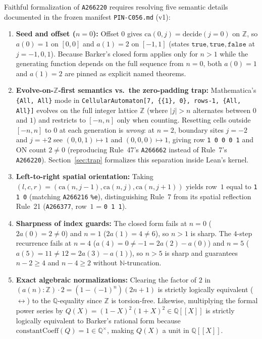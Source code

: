 \documentclass[11pt]{article}
\newcommand{\llbracket}{[\![}
\newcommand{\rrbracket}{]\!]}
\theoremstyle{definition}
\newcommand{\N}{\mathbb{N}}
\newcommand{\Z}{\mathbb{Z}}
\newcommand{\Q}{\mathbb{Q}}
\newcommand{\seq}[1]{\texttt{#1}}
\newcommand{\ca}{\mathrm{ca}}
\newcommand{\btrue}{\mathtt{true}}
\newcommand{\bfalse}{\mathtt{false}}
\begin{document}
Faithful formalization of \seq{A266220} requires resolving five semantic details documented in the frozen manifest \texttt{PIN-C056.md} (v1):
\begin{enumerate}
\item \textbf{Seed and offset ($n = 0$):} Offset $0$ gives $\ca(0, j) = \mathrm{decide}(j = 0)$ on $\Z$, so $a(0) = 1$ on $[0, 0]$ and $a(1) = 2$ on $[-1, 1]$ (states $\btrue, \btrue, \bfalse$ at $j = -1, 0, 1$). Because Barker's closed form applies only for $n > 1$ while the generating function depends on the full sequence from $n = 0$, both $a(0) = 1$ and $a(1) = 2$ are pinned as explicit named theorems.
\item \textbf{Evolve-on-$\Z$-first semantics vs.\ the zero-padding trap:} Mathematica's \texttt{\{All, All\}} mode in \texttt{CellularAutomaton[7, \{\{1\}, 0\}, rows-1, \{All, All\}]} evolves on the full integer lattice $\Z$ (where $|j| > n$ alternates between $0$ and $1$) and restricts to $[-n, n]$ only when counting. Resetting cells outside $[-n, n]$ to $0$ at each generation is \emph{wrong}: at $n = 2$, boundary sites $j = -2$ and $j = +2$ see $(0, 0, 1) \mapsto 1$ and $(0, 0, 0) \mapsto 1$, giving row \texttt{1 0 0 0 1} and ON count $2 \ne 0$ (reproducing Rule~47's \seq{A266662} instead of Rule~7's \seq{A266220}). Section~\ref{sec:trap} formalizes this separation inside Lean's kernel.
\item \textbf{Left-to-right spatial orientation:} Taking $(l, c, r) = (\ca(n, j - 1), \ca(n, j), \ca(n, j + 1))$ yields row~$1$ equal to \texttt{1 1 0} (matching \seq{A266216} \texttt{\%e}), distinguishing Rule~7 from its spatial reflection Rule~21 (\seq{A266377}, row~$1$ = \texttt{0 1 1}).
\item \textbf{Sharpness of index guards:} The closed form fails at $n = 0$ ($2a(0) = 2 \ne 0$) and $n = 1$ ($2a(1) = 4 \ne 6$), so $n > 1$ is sharp. The $4$-step recurrence fails at $n = 4$ ($a(4) = 0 \ne -1 = 2a(2) - a(0)$) and $n = 5$ ($a(5) = 11 \ne 12 = 2a(3) - a(1)$), so $n > 5$ is sharp and guarantees $n - 2 \ge 4$ and $n - 4 \ge 2$ without $\N$-truncation.
\item \textbf{Exact algebraic normalizations:} Clearing the factor of $2$ in $(a(n) : \Z) \cdot 2 = (1 - (-1)^n)(2n + 1)$ is strictly logically equivalent ($\leftrightarrow$) to the $\Q$-equality since $\Z$ is torsion-free. Likewise, multiplying the formal power series by $Q(X) = (1 - X)^2(1 + X)^2 \in \Q\llbracket X \rrbracket$ is strictly logically equivalent to Barker's rational form because $\mathrm{constantCoeff}(Q) = 1 \in \Q^\times$, making $Q(X)$ a unit in $\Q\llbracket X \rrbracket$.
\end{enumerate}
\end{document}
